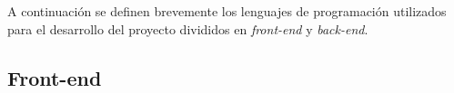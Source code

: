 A continuación se definen brevemente los lenguajes de programación utilizados para el desarrollo del proyecto divididos en \textit{front-end} y \textit{back-end}.

\subsection{Front-end}